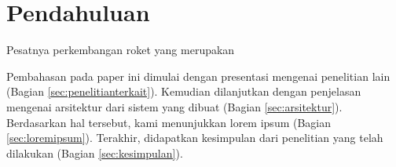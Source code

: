 \section{Pendahuluan}
\label{sec:pendahuluan}


Pesatnya perkembangan roket yang merupakan \lipsum[2-4]

Pembahasan pada paper ini dimulai dengan presentasi mengenai penelitian lain (Bagian \ref{sec:penelitianterkait}).
Kemudian dilanjutkan dengan penjelasan mengenai arsitektur dari sistem yang dibuat (Bagian \ref{sec:arsitektur}).
Berdasarkan hal tersebut, kami menunjukkan lorem ipsum (Bagian \ref{sec:loremipsum}).
Terakhir, didapatkan kesimpulan dari penelitian yang telah dilakukan (Bagian \ref{sec:kesimpulan}).
